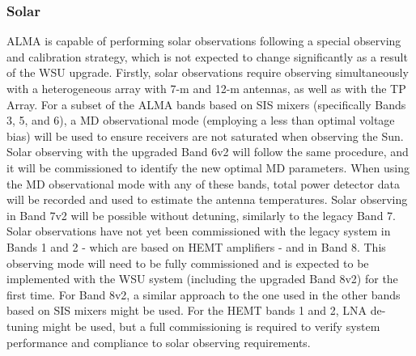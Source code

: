  \subsubsection{Solar}\label{sub:solar}

ALMA is capable of performing solar observations following a special observing and calibration strategy, which is not expected to change significantly as a result of the WSU upgrade. Firstly, solar observations require observing simultaneously with a heterogeneous array with 7-m and 12-m antennas, as well as with the TP Array. For a subset of the ALMA bands based on SIS mixers (specifically Bands 3, 5, and 6), a \ac{MD} observational mode (employing a less than optimal voltage bias) will be used to ensure receivers are not saturated when observing the Sun. Solar observing with the upgraded Band 6v2 will follow the same procedure, and it will be  commissioned to identify the new optimal \ac{MD} parameters. When using the \ac{MD} observational mode with any of these bands, total power detector data will be recorded and used to estimate the antenna temperatures. Solar observing in Band 7v2 will be possible without detuning, similarly to the legacy Band 7. Solar observations have not yet been commissioned with the legacy system in Bands 1 and 2 - which are based on \ac{HEMT} amplifiers - and in Band 8. This observing mode will need to be fully commissioned and is expected to be implemented with the WSU system (including the upgraded Band 8v2) for the first time. For Band 8v2, a similar approach to the one used in the other bands based on SIS mixers might be used. For the HEMT bands 1 and 2, LNA de-tuning might be used, but a full commissioning is required to verify system performance and compliance to solar observing requirements.



